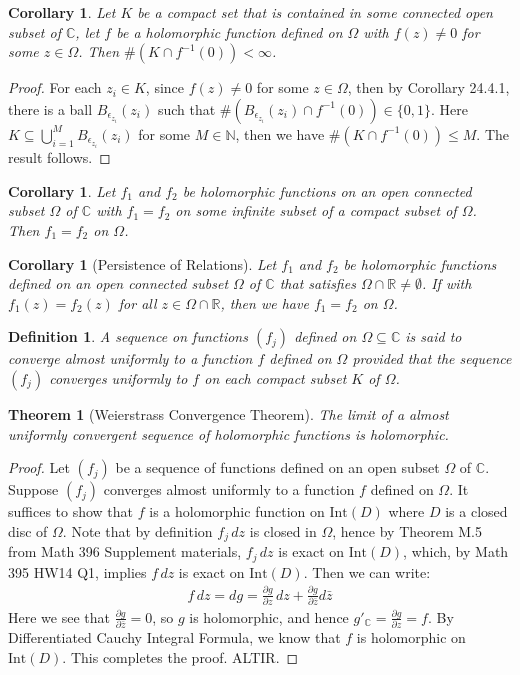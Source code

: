 \documentclass[11pt,oneside]{book}
\theoremstyle{break}
\theoremstyle{break}
\newtheorem{thm}{Theorem}[section]
\newtheorem{corL}{Corollary}[lem]
\newtheorem{corT}[lem]{Corollary}
\newtheorem{defn}{Definition}[corL]
\newcommand{\R}{\mathbb{R}}
\newcommand{\N}{\mathbb{N}}
\newcommand{\Complex}{\mathbb{C}}
\newcommand{\Int}{\text{Int}}
\begin{document}
\begin{corT}
Let $K$ be a compact set that is contained in some connected open subset of $\Complex$, let $f$ be a holomorphic function defined on $\Omega$ with $f(z) \neq 0$ for some $z\in \Omega$. Then $\#(K\cap f^{-1}(0)) < \infty$. 
\end{corT}
\begin{proof}
For each $z_i \in K$, since $f(z)\neq 0$ for some $z \in \Omega$, then by Corollary 24.4.1, there is a ball $B_{\epsilon_{z_i}}(z_i)$ such that $\#(B_{\epsilon_{z_i}}(z_i) \cap f^{-1}(0)) \in \{0,1\}$. Here $K \subseteq \bigcup_{i=1}^M B_{\epsilon_{z_i}}(z_i)$ for some $M \in \N$, then we have $\#(K\cap f^{-1}(0)) \leq M$. The result follows. 
\end{proof}

\begin{corT}
Let $f_1$ and $f_2$ be holomorphic functions on an open connected subset $\Omega$ of $\Complex$ with $f_1 = f_2$ on some infinite subset of a compact subset of $\Omega$. Then $f_1 = f_2$ on $\Omega$. 
\end{corT}

\begin{corL}[Persistence of Relations]
Let $f_1$ and $f_2$ be holomorphic functions defined on an open connected subset $\Omega$ of $\Complex$ that satisfies $\Omega \cap \R \neq \emptyset$.
If with $f_1(z) = f_2(z)$ for all $z \in \Omega\cap \R$, then we have $f_1 = f_2$ on $\Omega$. 
\end{corL}

\begin{defn}
A sequence on functions $(f_j)$ defined on $\Omega\subseteq \Complex$ is said to converge almost uniformly to a function $f$ defined on $\Omega$ provided that the sequence $(f_j)$ converges uniformly to $f$ on each compact subset $K$ of $\Omega$.
\end{defn}


\begin{thm}[Weierstrass Convergence Theorem]
The limit of a almost uniformly convergent sequence of holomorphic functions is holomorphic. 
\end{thm}

\begin{proof}
Let $(f_j)$ be a sequence of functions defined on an open subset $\Omega$ of $\Complex$. Suppose $(f_j)$ converges almost uniformly to a function $f $ defined on $\Omega$.  It suffices to show that $f$ is a holomorphic function on $\Int(D)$ where $D$ is a closed disc of $\Omega$. Note that by definition $f_j \, dz$ is closed in $\Omega$, hence by Theorem M.5 from Math 396 Supplement materials, $f_j \, dz$ is exact on $\Int(D)$, which, by Math 395 HW14 Q1, implies $f\, dz$ is exact on $\Int(D)$. Then we can write:
\begin{align*}
 f \, dz = dg = \frac{\partial g}{\partial z}\, dz + \frac{\partial g}{\partial \bar{z}}d\bar{z}
\end{align*}
Here we see that $\frac{\partial g}{\partial \bar{z}} = 0$, so $g$ is holomorphic, and hence $g'_{\Complex} = \frac{\partial g}{\partial z} = f$. By Differentiated Cauchy Integral Formula, we know that $f$ is holomorphic on $\Int(D)$. This completes the proof. ALTIR.
\end{proof}
\end{document}
